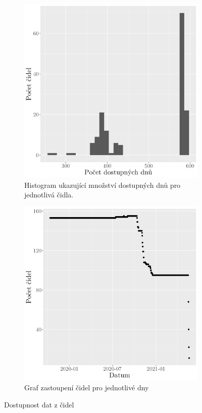 \begin{figure}
	\centering
	\begin{subfigure}{0.45\textwidth}
  \includegraphics[width=\textwidth]{img/hist_numofdayavailability.png}
	\caption{Histogram ukazující množství dostupných dnů pro jednotlivá čidla.}
	\label{fig:dostupnostdat}
	\end{subfigure}
	\hfill
	\begin{subfigure}{0.45\textwidth}
  \includegraphics[width=\textwidth]{img/date_availability.png}
	\caption{Graf zastoupení čidel pro jednotlivé dny}
	\label{fig:dostupnostdnu}
	\end{subfigure}
	\caption{Dostupnost dat z čidel}
\end{figure}

